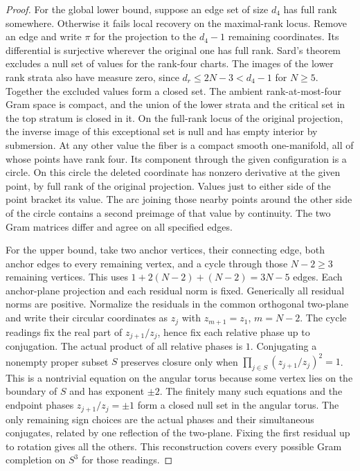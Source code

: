 \documentclass[11pt,reqno]{amsart}
\theoremstyle{definition}
\theoremstyle{remark}
\numberwithin{equation}{section}
\begin{document}
\begin{proof}
For the global lower bound, suppose an edge set of size $d_4$ has
full rank somewhere. Otherwise it fails local recovery on the
maximal-rank locus. Remove an edge and write $\pi$ for the
projection to the $d_4-1$ remaining coordinates. Its differential
is surjective wherever the original one has full rank. Sard's
theorem \cite{m8:sard} excludes a null set of values for the
rank-four charts. The images of the lower rank strata also have
measure zero, since $d_r\le2N-3<d_4-1$ for $N\ge5$. Together
the excluded values form a closed set. The ambient rank-at-most-four
Gram space is compact, and the union of the lower strata and the
critical set in the top stratum is closed in it. On the full-rank
locus of the original projection, the inverse image of this
exceptional set is null and has empty interior by submersion.
At any other value the fiber is a compact smooth one-manifold,
all of whose points have rank four. Its component through the
given configuration is a circle. On this circle the deleted
coordinate has nonzero derivative at the given point, by full
rank of the original projection. Values just to either side of
the point bracket its value. The arc joining those nearby points
around the other side of the circle contains a second preimage of
that value by continuity. The two Gram matrices differ and agree
on all specified edges.

For the upper bound, take two anchor vertices, their connecting
edge, both anchor edges to every remaining vertex, and a cycle
through those $N-2\ge3$ remaining vertices. This uses
$1+2(N-2)+(N-2)=3N-5$ edges. Each anchor-plane projection and
each residual norm is fixed. Generically all residual norms are
positive. Normalize the residuals in the common orthogonal
two-plane and write their circular coordinates as $z_j$ with
$z_{m+1}=z_1$, $m=N-2$. The cycle readings fix the real part of
$z_{j+1}/z_j$, hence fix each relative phase up to conjugation.
The actual product of all relative phases is $1$. Conjugating a
nonempty proper subset $S$ preserves closure only when
$\prod_{j\in S}(z_{j+1}/z_j)^2=1$. This is a nontrivial equation
on the angular torus because some vertex lies on the boundary
of $S$ and has exponent $\pm2$. The finitely many such equations
and the endpoint phases $z_{j+1}/z_j=\pm1$ form a closed null set in the angular torus. The only remaining sign choices
are the actual phases and their simultaneous conjugates, related
by one reflection of the two-plane. Fixing the first residual up
to rotation gives all the others. This reconstruction covers every
possible Gram completion on $S^3$ for those readings.
\end{proof}
\end{document}
